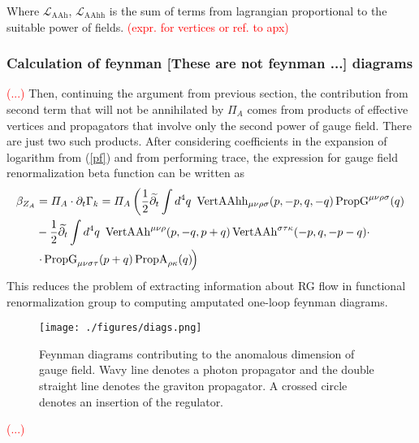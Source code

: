 \documentclass[11pt, a4paper]{article}
\newcommand{\jhkbf}[1]{\textbf{\color{red} [#1]}}
\begin{document}
Where $\mathcal{L}_{\text{AAh}}$, $\mathcal{L}_{\text{AAhh}}$ is the sum of terms from lagrangian proportional to the suitable power of fields.
\textcolor{red}{(expr. for vertices or ref. to apx)}
 
\subsubsection{Calculation of feynman \jhkbf{These are not feynman ...} diagrams}
\textcolor{red}{(...)} Then, continuing the argument from previous section, the contribution from second term that will not be annihilated
by $\varPi_A$ comes from products of effective vertices and propagators that involve only the second power of gauge field.
There are just two such products. After considering coefficients in the expansion of logarithm from (\ref{pf}) and from performing trace, the expression for gauge field renormalization beta function can be written as
\begin{align}
    \beta_{Z_A} & = \varPi_A \cdot \partial_t \Gamma_k = \varPi_A \left( \frac{1}{2} \widetilde{\partial_t} \int d^4 q \ \operatorname{VertAAhh}_{\mu\nu\rho\sigma}(p,-p,q,-q) \operatorname{PropG}^{\mu\nu\rho\sigma}(q)\right.\\
    & - \frac{1}{2} \widetilde{\partial_t} \int d^4 q \ \operatorname{VertAAh}^{\mu\nu\rho}(p,-q,p+q) \operatorname{VertAAh}^{\sigma\tau\kappa}(-p,q,-p-q) \cdot \\
    &\left. \cdot \operatorname{PropG}_{\mu\nu\sigma\tau}(p+q) \operatorname{PropA}_{\rho\kappa}(q) \phantom{\frac{}{}} \hspace{-0.35em}\right)
\end{align}
This reduces the problem of extracting information about RG flow in functional renormalization group to computing amputated one-loop feynman diagrams.
\begin{figure}[H]
    \texttt{[image: ./figures/diags.png]}
    \caption{Feynman diagrams contributing to the anomalous dimension of gauge field. Wavy line denotes a photon propagator
    and the double straight line denotes the graviton propagator. A crossed circle denotes an insertion of the regulator.}
    \label{diags}
\end{figure} 

\textcolor{red}{(...)}\\
\end{document}
